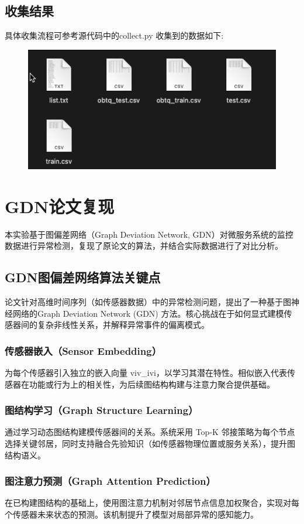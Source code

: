 \documentclass[hyperref,a4paper,UTF8]{ctexart}
\begin{document}
\subsection{收集结果}
具体收集流程可参考源代码中的collect.py
收集到的数据如下:
\begin{figure}[H]
    \centering
    \includegraphics[width=0.75\linewidth]{数据收集/1.png}
    \label{fig:enter-label}
\end{figure}

\section{GDN论文复现}
本实验基于图偏差网络（Graph Deviation Network, GDN）对微服务系统的监控数据进行异常检测，复现了原论文的算法，并结合实际数据进行了对比分析。

\subsection{GDN图偏差网络算法关键点}
论文针对高维时间序列（如传感器数据）中的异常检测问题，提出了一种基于图神经网络的Graph Deviation Network (GDN) 方法。核心挑战在于如何显式建模传感器间的复杂非线性关系，并解释异常事件的偏离模式。
\subsubsection{传感器嵌入（Sensor Embedding）}
    为每个传感器引入独立的嵌入向量 viv\_ivi，以学习其潜在特性。相似嵌入代表传感器在功能或行为上的相关性，为后续图结构构建与注意力聚合提供基础。
\subsubsection{图结构学习（Graph Structure Learning）}
    通过学习动态图结构建模传感器间的关系。系统采用 Top-K 邻接策略为每个节点选择关键邻居，同时支持融合先验知识（如传感器物理位置或服务关系），提升图结构语义。
\subsubsection{图注意力预测（Graph Attention Prediction）}
    在已构建图结构的基础上，使用图注意力机制对邻居节点信息加权聚合，实现对每个传感器未来状态的预测。该机制提升了模型对局部异常的感知能力。
\end{document}
